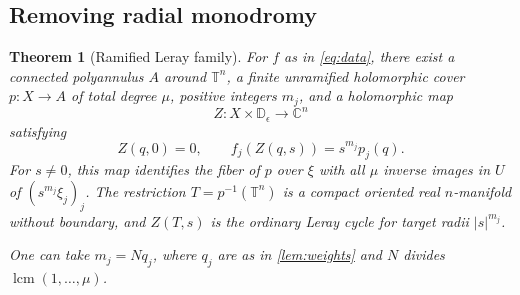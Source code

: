 \documentclass[11pt,letterpaper]{article}
\newtheorem{theorem}{Theorem}[section]
\theoremstyle{definition}
\theoremstyle{remark}
\newcommand{\C}{\mathbb C}\newcommand{\R}{\mathbb R}
\newcommand{\T}{\mathbb T}\newcommand{\D}{\mathbb D}
\numberwithin{equation}{section}
\begin{document}
\subsection{Removing radial monodromy}
\begin{theorem}[Ramified Leray family]\label{thm:ordinary}
For $f$ as in \eqref{eq:data}, there exist a connected polyannulus $A$ around
$\T^n$, a finite unramified holomorphic cover $p:X\to A$ of total degree
$\mu$, positive integers $m_j$, and a holomorphic map
\[
 Z:X\times\D_\epsilon\longrightarrow\C^n
\]
satisfying
\begin{equation}\label{eq:ordinaryZ}
 Z(q,0)=0,\qquad f_j(Z(q,s))=s^{m_j}p_j(q).
\end{equation}
For $s\ne0$, this map identifies the fiber of $p$ over $\xi$ with all
$\mu$ inverse images in $U$ of $(s^{m_j}\xi_j)_j$. The restriction
$T=p^{-1}(\T^n)$ is a compact oriented real $n$-manifold without boundary,
and $Z(T,s)$ is the ordinary Leray cycle for target radii $|s|^{m_j}$.

One can take $m_j=Nq_j$, where $q_j$ are as in \cref{lem:weights} and $N$
divides $\operatorname{lcm}(1,\ldots,\mu)$.
\end{theorem}
\end{document}
